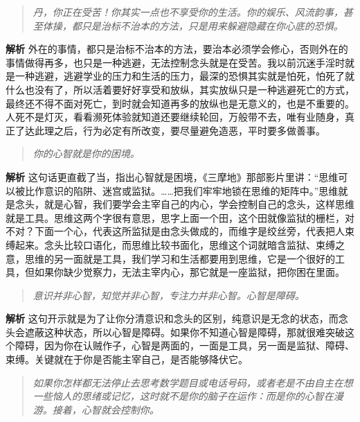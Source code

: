 \begin{quote}\it
    丹，你正在受苦！你其实一点也不享受你的生活。你的娱乐、风流韵事，甚至体操，都只是治标不治本的方法，只是用来躲避隐藏在你心底的恐惧。
\end{quote}

\textbf{解析} 外在的事情，都只是治标不治本的方法，要治本必须学会修心，否则外在的事情做得再多，也只是一种逃避，无法控制念头就是在受苦。我以前沉迷手淫时就是一种逃避，逃避学业的压力和生活的压力，最深的恐惧其实就是怕死，怕死了就什么也没有了，所以活着要好好享受和放纵，其实放纵只是一种逃避死亡的方式，最终还不得不面对死亡，到时就会知道再多的放纵也是无意义的，也是不重要的。人死不是灯灭，看看濒死体验就知道还要继续轮回，万般带不去，唯有业随身，真正了达此理之后，行为必定有所改变，要尽量避免造恶，平时要多做善事。

\begin{quote}\it
    你的心智就是你的困境。
\end{quote}

\textbf{解析} 这句话更直截了当，指出心智就是困境，《三摩地》那部影片里讲：“思维可以被比作意识的陷阱、迷宫或监狱。……把我们牢牢地锁在思维的矩阵中。”思维就是念头，就是心智，我们要学会主宰自己的内心，学会控制自己的念头，这样思维就是工具。思维这两个字很有意思，思字上面一个田，这个田就像监狱的栅栏，对不对？下面一个心，代表这所监狱是由念头做成的，而维字是绞丝旁，代表把人束缚起来。念头比较口语化，而思维比较书面化，思维这个词就暗含监狱、束缚之意，思维的另一面就是工具，我们学习和生活都要用到思维，它是一个很好的工具，但如果你缺少觉察力，无法主宰内心，那它就是一座监狱，把你困在里面。

\begin{quote}\it
    意识并非心智，知觉并非心智，专注力并非心智。心智是障碍。
\end{quote}

\textbf{解析} 这句开示就是为了让你分清意识和念头的区别，纯意识是无念的状态，而念头会遮蔽这种状态，所以心智是障碍。如果你不知道心智是障碍，那就很难突破这个障碍，因为你在认贼作子，心智是两面的，一面是工具，另一面是监狱、障碍、束缚。关键就在于你是否能主宰自己，是否能够降伏它。

\begin{quote}\it
    如果你怎样都无法停止去思考数学题目或电话号码，或者老是不由自主在想一些恼人的思绪或记忆，这时就不是你的脑子在运作：而是你的心智在漫游。接着，心智就会控制你。
\end{quote}

